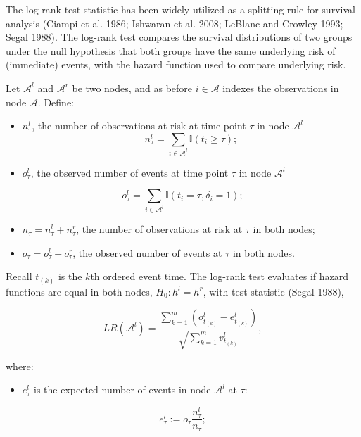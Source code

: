 \documentclass[
  letterpaper,
  krantz2]{style/krantz}
\providecommand{\tightlist}{%
  \setlength{\itemsep}{0pt}\setlength{\parskip}{0pt}}
\begin{document}
The log-rank test statistic has been widely utilized as a splitting rule
for survival analysis (Ciampi et al. 1986; Ishwaran et al. 2008; LeBlanc
and Crowley 1993; Segal
1988). The
log-rank test compares the survival distributions of two groups under
the null hypothesis that both groups have the same underlying risk of
(immediate) events, with the hazard function used to compare underlying
risk.

Let \(\mathcal{A}^l\) and \(\mathcal{A}^r\) be two nodes, and as before
\(i \in \mathcal{A}\) indexes the observations in node \(\mathcal{A}\).
Define:

\begin{itemize}
\item
  \(n_\tau^l\), the number of observations at risk at time point
  \(\tau\) in node \(\mathcal{A}^l\) \[
  n_\tau^l = \sum_{i \in \mathcal{A}^l} \mathbb{I}(t_i \geq \tau);
  \]
\item
  \(o^l_{\tau}\), the observed number of events at time point \(\tau\)
  in node \(\mathcal{A}^l\)
\end{itemize}

\[
o^l_{\tau} = \sum_{i \in \mathcal{A}^l} \mathbb{I}(t_i = \tau, \delta_i = 1);
\]

\begin{itemize}
\tightlist
\item
  \(n_\tau = n_\tau^l + n_\tau^r\), the number of observations at risk
  at \(\tau\) in both nodes;
\item
  \(o_\tau = o^l_{\tau} + o^r_{\tau}\), the observed number of events at
  \(\tau\) in both nodes.
\end{itemize}

Recall \(t_{(k)}\) is the \(k\)th ordered event time. The log-rank test
evaluates if hazard functions are equal in both nodes,
\(H_0: h^l = h^r\), with test statistic (Segal 1988),

\[
LR(\mathcal{A}^l) = \frac{\sum_{k=1}^m (o^l_{t_{(k)}} - e^l_{t_{(k)}})}{\sqrt{\sum_{k=1}^m v_{t_{(k)}}^l}},
\]

where:

\begin{itemize}
\tightlist
\item
  \(e^l_{\tau}\) is the expected number of events in node
  \(\mathcal{A}^l\) at \(\tau\):
\end{itemize}

\[
e^l_{\tau} := o_\tau\frac{n_\tau^l}{n_\tau};
\]
\end{document}
